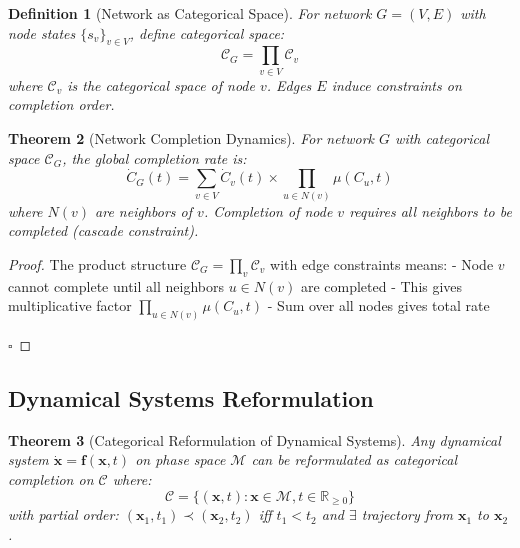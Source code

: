 \documentclass[12pt,a4paper]{article}
\newtheorem{theorem}{Theorem}[section]
\newtheorem{definition}[theorem]{Definition}
\begin{document}
\begin{definition}[Network as Categorical Space]
\label{def:network_categorical}
For network $G = (V, E)$ with node states $\{s_v\}_{v \in V}$, define categorical space:
\begin{equation}
\mathcal{C}_G = \prod_{v \in V} \mathcal{C}_v
\end{equation}
where $\mathcal{C}_v$ is the categorical space of node $v$. Edges $E$ induce constraints on completion order.
\end{definition}

\begin{theorem}[Network Completion Dynamics]
\label{thm:network_dynamics}
For network $G$ with categorical space $\mathcal{C}_G$, the global completion rate is:
\begin{equation}
\dot{C}_G(t) = \sum_{v \in V} \dot{C}_v(t) \times \prod_{u \in N(v)} \mu(C_u, t)
\end{equation}
where $N(v)$ are neighbors of $v$. Completion of node $v$ requires all neighbors to be completed (cascade constraint).
\end{theorem}

\begin{proof}
The product structure $\mathcal{C}_G = \prod_{v} \mathcal{C}_v$ with edge constraints means:
- Node $v$ cannot complete until all neighbors $u \in N(v)$ are completed
- This gives multiplicative factor $\prod_{u \in N(v)} \mu(C_u, t)$
- Sum over all nodes gives total rate

$\square$
\end{proof}

\subsection{Dynamical Systems Reformulation}

\begin{theorem}[Categorical Reformulation of Dynamical Systems]
\label{thm:dynamical_reformulation}
Any dynamical system $\dot{\mathbf{x}} = \mathbf{f}(\mathbf{x}, t)$ on phase space $\mathcal{M}$ can be reformulated as categorical completion on $\mathcal{C}$ where:
\begin{equation}
\mathcal{C} = \{(\mathbf{x}, t) : \mathbf{x} \in \mathcal{M}, t \in \mathbb{R}_{\geq 0}\}
\end{equation}
with partial order: $(\mathbf{x}_1, t_1) \prec (\mathbf{x}_2, t_2)$ iff $t_1 < t_2$ and $\exists$ trajectory from $\mathbf{x}_1$ to $\mathbf{x}_2$.
\end{theorem}
\end{document}
